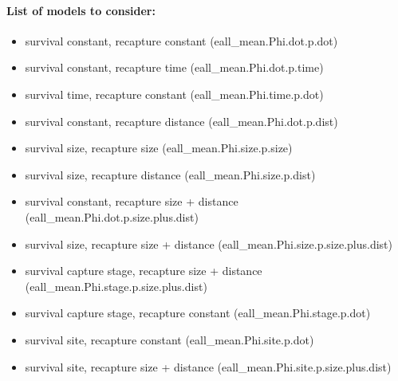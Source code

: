 \documentclass[12pt, oneside]{article}   	%
\begin{document}
\paragraph*{List of models to consider:}
\begin{itemize}
	\item survival constant, recapture constant (eall\_mean.Phi.dot.p.dot)
	\item survival constant, recapture time (eall\_mean.Phi.dot.p.time)
	\item survival time, recapture constant (eall\_mean.Phi.time.p.dot)
	\item survival constant, recapture distance (eall\_mean.Phi.dot.p.dist)
	\item survival size, recapture size (eall\_mean.Phi.size.p.size)
	\item survival size, recapture distance (eall\_mean.Phi.size.p.dist)
	\item survival constant, recapture size + distance (eall\_mean.Phi.dot.p.size.plus.dist)
	\item survival size, recapture size + distance (eall\_mean.Phi.size.p.size.plus.dist)
	\item survival capture stage, recapture size + distance (eall\_mean.Phi.stage.p.size.plus.dist)
	\item survival capture stage, recapture constant (eall\_mean.Phi.stage.p.dot)
	\item survival site, recapture constant (eall\_mean.Phi.site.p.dot)
	\item survival site, recapture size + distance (eall\_mean.Phi.site.p.size.plus.dist)
\end{itemize}
\end{document}
